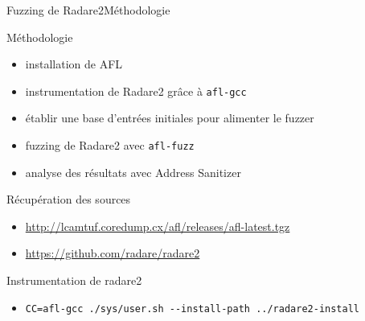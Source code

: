 \begin{frame}[fragile]{Fuzzing de Radare2}{Méthodologie}
  \begin{block}{Méthodologie}
    \begin{itemize}
    \item{installation de AFL}
    \item{instrumentation de Radare2 grâce à \lstinline{afl-gcc}}
    \item{établir une base d'entrées initiales pour alimenter le fuzzer}
    \item{fuzzing de Radare2 avec \lstinline{afl-fuzz}}
    \item{analyse des résultats avec Address Sanitizer}
    \end{itemize}
  \end{block}

  \pause

  \begin{exampleblock}{Récupération des sources}
    \begin{itemize}
    \item{\url{http://lcamtuf.coredump.cx/afl/releases/afl-latest.tgz}}
    \item{\url{https://github.com/radare/radare2}}
    \end{itemize}
  \end{exampleblock}

  \pause
  \vfill

  \begin{exampleblock}{Instrumentation de radare2}
    \begin{itemize}
    \item \lstinline{CC=afl-gcc ./sys/user.sh --install-path ../radare2-install}
    \end{itemize}
  \end{exampleblock}

\end{frame}


